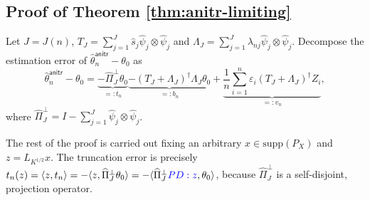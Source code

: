 \documentclass[aos]{imsart}
\renewcommand{\hat}{\widehat}
\newcommand{\supp}{\mathrm{supp}}
\newcommand{\ud}{\mathrm d}
\newcommand{\anitr}{\mathsf{anitr}}
\newcommand{\pd}[1]{%
	{ \color{blue} PD: #1}%
}
\theoremstyle{plain}
\theoremstyle{definition}
\theoremstyle{definition}
\begin{document}
\begin{appendix}

\subsection{Proof of Theorem \ref{thm:anitr-limiting}}

Let $J=J(n)$, $T_J=\sum_{j=1}^J \hat s_j\hat\psi_j\otimes \hat\psi_j$ and $\Lambda_J=\sum_{j=1}^J\lambda_{nj}\hat\psi_j\otimes\hat\psi_j$.
Decompose the estimation error of $\hat\theta_n^\anitr-\theta_0$ as
\begin{equation}
\hat\theta_n^\anitr-\theta_0 = \underbrace{-\hat\Pi_J^\perp\theta_0}_{=:t_n} \underbrace{-(T_J+\Lambda_J)^\dagger \Lambda_J\theta_0}_{=: b_n} + \underbrace{\frac{1}{n}\sum_{i=1}^n\varepsilon_i (T_J+\Lambda_J)^\dagger Z_i}_{=:v_n},
\label{eq:anitr-decomp}
\end{equation}
where $\hat\Pi_J^\perp = I - \sum_{j=1}^J\hat\psi_j\otimes\hat\psi_j$.

The rest of the proof is carried out fixing an arbitrary $x\in\supp(P_X)$ and $z=L_{K^{1/2}}x$. 
The truncation error is precisely $t_n(z)=\langle z, t_n\rangle = -\langle z, \hat\Pi_J^\perp\theta_0\rangle = -\langle \hat\Pi_J^\perp \pd{z},\theta_0\rangle$, 
because $\hat\Pi_J^\perp$ is a self-disjoint, projection operator.


\end{appendix}
\end{document}
